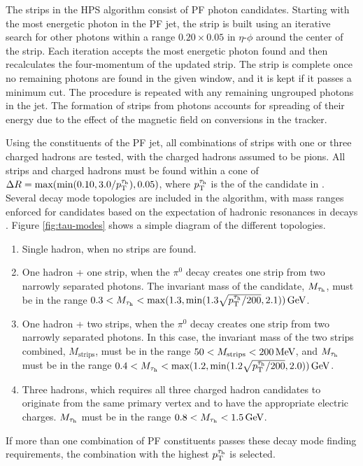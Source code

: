 The strips in the HPS algorithm consist of PF photon candidates. Starting with the most energetic photon in the PF jet, the strip is built using an iterative search for other photons within a range $0.20\times0.05$ in $\eta$-$\phi$ around the center of the strip. Each iteration accepts the most energetic photon found and then recalculates the four-momentum of the updated strip. The strip is complete once no remaining photons are found in the given window, and it is kept if it passes a minimum \pt cut. The procedure is repeated with any remaining ungrouped photons in the jet. The formation of strips from photons accounts for spreading of their energy due to the effect of the magnetic field on conversions in the tracker.

Using the constituents of the PF jet, all combinations of strips with one or three charged hadrons are tested, with the charged hadrons assumed to be pions. All strips and charged hadrons must be found within a cone of $\Delta R = \text{max}(\text{min}(0.10,3.0/p_{\mathrm{T}}^{\tau_{\text{h}}}),0.05)$, where $p_{\mathrm{T}}^{\tau_{\text{h}}}$ is the \pt of the \tauh candidate in \GeVns. Several decay mode topologies are included in the algorithm, with mass ranges enforced for candidates based on the expectation of hadronic resonances in decays \cite{CMS-AN-2014-008}. Figure \ref{fig:tau-modes} shows a simple diagram of the different topologies.
\begin{enumerate}
\item Single hadron, when no strips are found.
\item One hadron + one strip, when the $\pi^0$ decay creates one strip from two narrowly separated photons. The invariant mass of the \tauh candidate, $M_{\tau_{\text{h}}}$, must be in the range $0.3 < M_{\tau_{\text{h}}} < \text{max}(1.3,\text{min}(1.3\sqrt{p_{\mathrm{T}}^{\tau_{\text{h}}}/200},2.1))\,\text{Ge\hspace{-.08em}V}$.
\item One hadron + two strips, when the $\pi^0$ decay creates one strip from two narrowly separated photons. In this case, the invariant mass of the two strips combined, $M_{\text{strips}}$, must be in the range $50 < M_{\text{strips}} < 200\,\text{Me\hspace{-.08em}V}$, and $M_{\tau_{\text{h}}}$ must be in the range $0.4 < M_{\tau_{\text{h}}} < \text{max}(1.2,\text{min}(1.2\sqrt{p_{\mathrm{T}}^{\tau_{\text{h}}}/200},2.0))\,\text{Ge\hspace{-.08em}V}$.
\item Three hadrons, which requires all three charged hadron candidates to originate from the same primary vertex and to have the appropriate electric charges. $M_{\tau_{\text{h}}}$ must be in the range $0.8 < M_{\tau_{\text{h}}} < 1.5\,\text{Ge\hspace{-.08em}V}$.
\end{enumerate}
If more than one combination of PF constituents passes these decay mode finding requirements, the combination with the highest $p_{\mathrm{T}}^{\tau_{\text{h}}}$ is selected.

